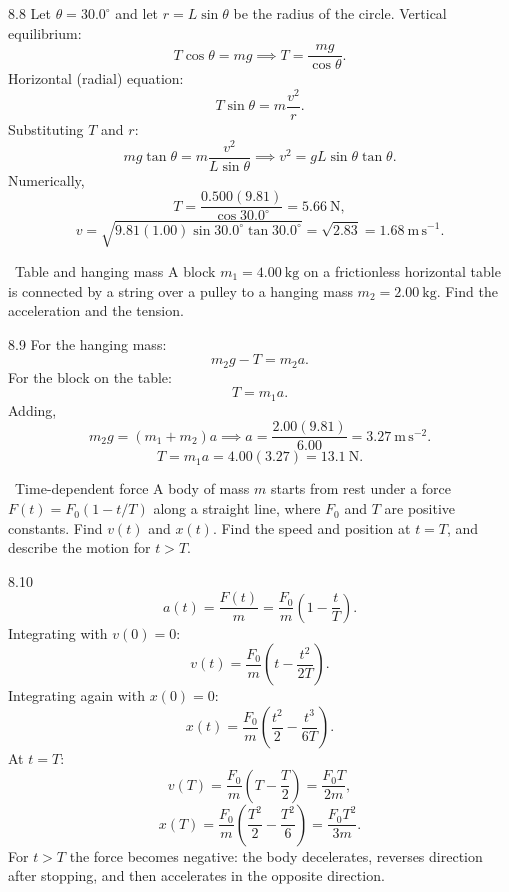 \begin{solution}{8.8}
Let $\theta=30.0^\circ$ and let $r=L\sin\theta$ be the radius of the circle.
Vertical equilibrium:
\[
T\cos\theta=mg
\implies
T=\frac{mg}{\cos\theta}.
\]
Horizontal (radial) equation:
\[
T\sin\theta=m\frac{v^2}{r}.
\]
Substituting $T$ and $r$:
\[
mg\tan\theta=m\frac{v^2}{L\sin\theta}
\implies
v^2=gL\sin\theta\tan\theta.
\]
Numerically,
\[
T=\frac{0.500(9.81)}{\cos30.0^\circ}=5.66\ \mathrm{N},
\]
\[
v=\sqrt{9.81(1.00)\sin30.0^\circ\tan30.0^\circ}
=\sqrt{2.83}=1.68\ \mathrm{m\,s^{-1}}.
\]
\end{solution}

\begin{exercise}{\core\ Table and hanging mass}
A block $m_1=4.00\ \mathrm{kg}$ on a frictionless horizontal table is connected
by a string over a pulley to a hanging mass $m_2=2.00\ \mathrm{kg}$. Find the
acceleration and the tension.
\end{exercise}

\begin{tabletworkspace}[6.5cm]
\end{tabletworkspace}

\begin{solution}{8.9}
For the hanging mass:
\[
m_2g-T=m_2a.
\]
For the block on the table:
\[
T=m_1a.
\]
Adding,
\[
m_2g=(m_1+m_2)a
\implies
a=\frac{2.00(9.81)}{6.00}=3.27\ \mathrm{m\,s^{-2}}.
\]
\[
T=m_1a=4.00(3.27)=13.1\ \mathrm{N}.
\]
\end{solution}

\begin{exercise}{\mastery\ Time-dependent force}
A body of mass $m$ starts from rest under a force
$F(t)=F_0(1-t/T)$ along a straight line, where $F_0$ and $T$ are positive
constants. Find $v(t)$ and $x(t)$. Find the speed and position at $t=T$, and
describe the motion for $t>T$.
\end{exercise}

\begin{tabletworkspace}[6.5cm]
\end{tabletworkspace}

\begin{solution}{8.10}
\[
a(t)=\frac{F(t)}{m}=\frac{F_0}{m}\left(1-\frac tT\right).
\]
Integrating with $v(0)=0$:
\[
v(t)=\frac{F_0}{m}\left(t-\frac{t^2}{2T}\right).
\]
Integrating again with $x(0)=0$:
\[
x(t)=\frac{F_0}{m}\left(\frac{t^2}{2}-\frac{t^3}{6T}\right).
\]
At $t=T$:
\[
v(T)=\frac{F_0}{m}\left(T-\frac T2\right)=\frac{F_0T}{2m},
\]
\[
x(T)=\frac{F_0}{m}\left(\frac{T^2}{2}-\frac{T^2}{6}\right)
=\frac{F_0T^2}{3m}.
\]
For $t>T$ the force becomes negative: the body decelerates, reverses direction
after stopping, and then accelerates in the opposite direction.
\end{solution}

